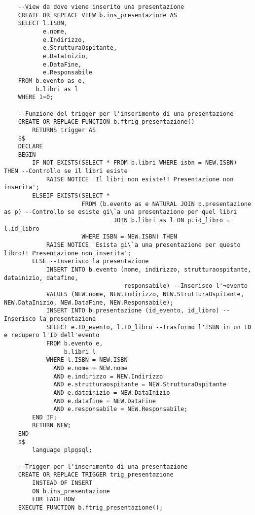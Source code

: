 \begin{lstlisting}
    --View da dove viene inserito una presentazione
    CREATE OR REPLACE VIEW b.ins_presentazione AS
    SELECT l.ISBN,
           e.nome,
           e.Indirizzo,
           e.StrutturaOspitante,
           e.DataInizio,
           e.DataFine,
           e.Responsabile
    FROM b.evento as e,
         b.libri as l
    WHERE 1=0;
    
    --Funzione del trigger per l'inserimento di una presentazione
    CREATE OR REPLACE FUNCTION b.ftrig_presentazione()
        RETURNS trigger AS
    $$
    DECLARE
    BEGIN
        IF NOT EXISTS(SELECT * FROM b.libri WHERE isbn = NEW.ISBN) THEN --Controllo se il libri esiste
            RAISE NOTICE 'Il libri non esiste!! Presentazione non inserita';
        ELSEIF EXISTS(SELECT *
                      FROM (b.evento as e NATURAL JOIN b.presentazione as p) --Controllo se esiste gi\`a una presentazione per quel libri
                               JOIN b.libri as l ON p.id_libro = l.id_libro
                      WHERE ISBN = NEW.ISBN) THEN
            RAISE NOTICE 'Esista gi\`a una presentazione per questo libro!! Presentazione non inserita';
        ELSE --Inserisco la presentazione
            INSERT INTO b.evento (nome, indirizzo, strutturaospitante, datainizio, datafine,
                                  responsabile) --Inserisco l'¬evento
            VALUES (NEW.nome, NEW.Indirizzo, NEW.StrutturaOspitante, NEW.DataInizio, NEW.DataFine, NEW.Responsabile);
            INSERT INTO b.presentazione (id_evento, id_libro) --Inserisco la presentazione
            SELECT e.ID_evento, l.ID_libro --Trasformo l'ISBN in un ID e recupero l'ID dell'evento
            FROM b.evento e,
                 b.libri l
            WHERE l.ISBN = NEW.ISBN
              AND e.nome = NEW.nome
              AND e.indirizzo = NEW.Indirizzo
              AND e.strutturaospitante = NEW.StrutturaOspitante
              AND e.datainizio = NEW.DataInizio
              AND e.datafine = NEW.DataFine
              AND e.responsabile = NEW.Responsabile;
        END IF;
        RETURN NEW;
    END
    $$
        language plpgsql;
    
    --Trigger per l'inserimento di una presentazione
    CREATE OR REPLACE TRIGGER trig_presentazione
        INSTEAD OF INSERT
        ON b.ins_presentazione
        FOR EACH ROW
    EXECUTE FUNCTION b.ftrig_presentazione();
\end{lstlisting}


\newpage


